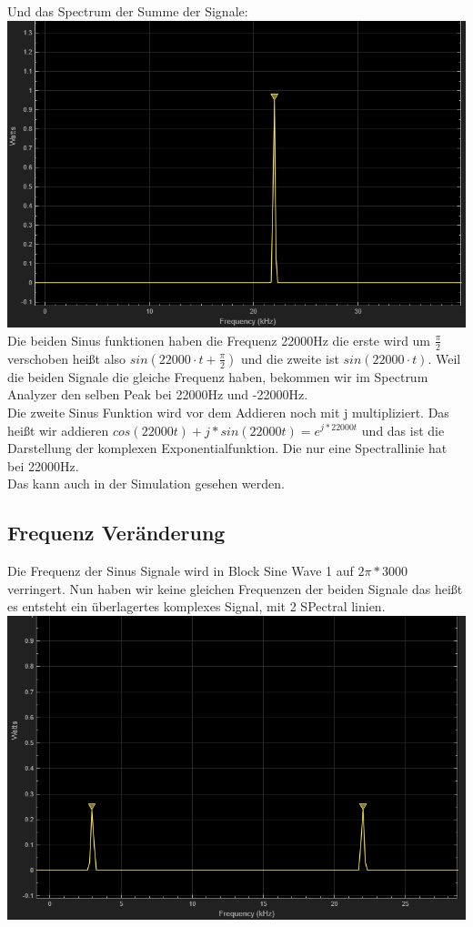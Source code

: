 \documentclass{scrartcl}
\begin{document}
Und das Spectrum der Summe der Signale:\\
\includegraphics[scale=0.5]{spectrumAdd.png} \\

Die beiden Sinus funktionen haben die Frequenz 22000Hz die erste wird um $\frac{\pi}{2}$ verschoben heißt also $sin(22000 \cdot t + \frac{\pi}{2})$ und die zweite ist $sin(22000 \cdot t)$. Weil die beiden Signale die gleiche Frequenz haben, bekommen wir im Spectrum Analyzer den selben Peak bei 22000Hz und -22000Hz.\\ 
Die zweite Sinus Funktion wird vor dem Addieren noch mit j multipliziert. Das heißt wir addieren $cos(22000t) + j*sin(22000t) = e^{j*22000t}$ und das ist die Darstellung der komplexen Exponentialfunktion. Die nur eine Spectrallinie hat bei 22000Hz.\\

Das kann auch in der Simulation gesehen werden.\\

\subsection*{Frequenz Veränderung}
Die Frequenz der Sinus Signale wird in Block Sine Wave 1 auf $2\pi * 3000$ verringert. Nun haben wir keine gleichen Frequenzen der beiden Signale das heißt es entsteht ein überlagertes komplexes Signal, mit 2 SPectral linien.\\

\includegraphics[scale=0.5]{spectrumAdd2.png} \\
\end{document}
